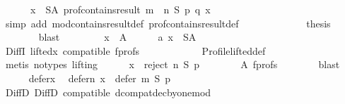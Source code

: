 \begin{isabellebody}
\ \ \ \ \ \ {\isachardoublequoteopen}{\isasymforall}x\ {\isasymin}\ S{\isacharminus}{\kern0pt}A{\isachardot}{\kern0pt}\ prof{\isacharunderscore}{\kern0pt}contains{\isacharunderscore}{\kern0pt}result\ {\isacharparenleft}{\kern0pt}m\ {\isasymparallel}\isactrlsub {\isasymup}\ n{\isacharparenright}{\kern0pt}\ S\ p\ q\ x{\isachardoublequoteclose}\isanewline
\ \ \ \ \ \ \isamarkupfalse%
\ {\isacharparenleft}{\kern0pt}simp\ add{\isacharcolon}{\kern0pt}\ mod{\isacharunderscore}{\kern0pt}contains{\isacharunderscore}{\kern0pt}result{\isacharunderscore}{\kern0pt}def\ prof{\isacharunderscore}{\kern0pt}contains{\isacharunderscore}{\kern0pt}result{\isacharunderscore}{\kern0pt}def{\isacharparenright}{\kern0pt}\isanewline
\ \ \ \ \isamarkupfalse%
\ {}{}\ {}{}\isanewline
\ \ \ \ \isamarkupfalse%
\ {\isacharquery}{\kern0pt}thesis\isanewline
\ \ \ \ \ \ \isamarkupfalse%
\ blast\isanewline
\ \ \isamarkupfalse%
\isanewline
\ \ \ \ \isamarkupfalse%
\ {\isachardoublequoteopen}x\ {\isasymnotin}\ A{\isachardoublequoteclose}\isanewline
\ \ \ \ \isamarkupfalse%
\ a{}{\isacharcolon}{\kern0pt}\ {\isachardoublequoteopen}x\ {\isasymin}\ S{\isacharminus}{\kern0pt}A{\isachardoublequoteclose}\isanewline
\ \ \ \ \ \ \isamarkupfalse%
\ DiffI\ lifted{\isacharunderscore}{\kern0pt}x\ compatible\ f{\isacharunderscore}{\kern0pt}profs\isanewline
\ \ \ \ \ \ \ \ \ \ \ \ Profile{\isachardot}{\kern0pt}lifted{\isacharunderscore}{\kern0pt}def\isanewline
\ \ \ \ \ \ \isamarkupfalse%
\ {\isacharparenleft}{\kern0pt}metis\ {\isacharparenleft}{\kern0pt}no{\isacharunderscore}{\kern0pt}types{\isacharcomma}{\kern0pt}\ lifting{\isacharparenright}{\kern0pt}{\isacharparenright}{\kern0pt}\isanewline
\ \ \ \ \isamarkupfalse%
\ {\isachardoublequoteopen}x\ {\isasymin}\ reject\ n\ S\ p{\isachardoublequoteclose}\isanewline
\ \ \ \ \ \ \isamarkupfalse%
\ A\ f{\isacharunderscore}{\kern0pt}profs\isanewline
\ \ \ \ \ \ \isamarkupfalse%
\ blast\isanewline
\ \ \ \ \isamarkupfalse%
\ defer{\isacharunderscore}{\kern0pt}x\ \isamarkupfalse%
\ defer{\isacharunderscore}{\kern0pt}n{\isacharcolon}{\kern0pt}\ {\isachardoublequoteopen}x\ {\isasymin}\ defer\ m\ S\ p{\isachardoublequoteclose}\isanewline
\ \ \ \ \ \ \isamarkupfalse%
\ DiffD{}\ DiffD{}\ compatible\ dcompat{\isacharunderscore}{\kern0pt}dec{\isacharunderscore}{\kern0pt}by{\isacharunderscore}{\kern0pt}one{\isacharunderscore}{\kern0pt}mod\isanewline

\end{isabellebody}
